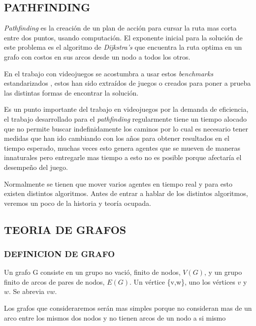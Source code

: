 
\subsection{PATHFINDING}

\textit{Pathfinding} es la creación de un plan de acción para cursar la ruta mas corta entre dos puntos, usando computación. El exponente inicial para la solución de este problema es el algoritmo de \textit{Dijkstra's} que encuentra la ruta optima en un grafo con costos en sus arcos desde un nodo a todos los otros.

En el trabajo con videojuegos se acostumbra a usar estos \textit{benchmarks} estandarizados \cite{sturtevant2012benchmarks}, estos han sido extraídos de juegos o creados para poner a prueba las distintas formas de encontrar la solución.

Es un punto importante del trabajo en videojuegos por la demanda de eficiencia, el trabajo desarrollado para el \textit{pathfinding} regularmente tiene un tiempo alocado que no permite buscar indefinidamente los caminos por lo cual es necesario tener medidas que han ido cambiando con los años para obtener resultados en el tiempo esperado, muchas veces esto genera agentes que se mueven de maneras innaturales pero entregarle mas tiempo a esto no es posible porque afectaría el desempeño del juego.

Normalmente se tienen que mover varios agentes en tiempo real y para esto existen distintos algoritmos. Antes de entrar a hablar de los distintos algoritmos, veremos un poco de la historia y teoría ocupada.

\subsection{TEORIA DE GRAFOS}

\subsubsection{DEFINICION DE GRAFO}

Un grafo G consiste en un grupo no vació, finito de nodos, $V(G)$, y un grupo finito de arcos de pares de nodos, $E(G)$. Un vértice \{v,w\}, uno los vértices $v$ y $w$. Se abrevia $vw$.

Los grafos que consideraremos serán mas simples porque no consideran mas de un arco entre los mismos dos nodos y no tienen arcos de un nodo a si mismo

